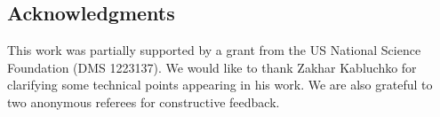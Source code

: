 \documentclass[twoside,11pt]{article}
\begin{document}
\subsection*{Acknowledgments}

This work was partially supported by a grant from the US National Science Foundation (DMS 1223137).  
We would like to thank Zakhar Kabluchko for clarifying some technical points appearing in his work. 
We are also grateful to two anonymous referees for constructive feedback.





\end{document}
